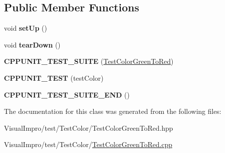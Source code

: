 \subsection*{Public Member Functions}
\begin{DoxyCompactItemize}
\item 
\mbox{\label{class_test_color_green_to_red_a1d3efc7d15a05c951a56916af3e9d48d}} 
void {\bfseries set\+Up} ()
\item 
\mbox{\label{class_test_color_green_to_red_a3a2f7169de469ee4d45d1b8146bbd484}} 
void {\bfseries tear\+Down} ()
\item 
\mbox{\label{class_test_color_green_to_red_a99e5c1ba045c28189f0a2e46fedb7020}} 
{\bfseries C\+P\+P\+U\+N\+I\+T\+\_\+\+T\+E\+S\+T\+\_\+\+S\+U\+I\+TE} (\mbox{\hyperlink{class_test_color_green_to_red}{Test\+Color\+Green\+To\+Red}})
\item 
\mbox{\label{class_test_color_green_to_red_ac56aef62b9bb965eaf2833a48be73298}} 
{\bfseries C\+P\+P\+U\+N\+I\+T\+\_\+\+T\+E\+ST} (test\+Color)
\item 
\mbox{\label{class_test_color_green_to_red_a893c499b5165abf0976094ece309470a}} 
{\bfseries C\+P\+P\+U\+N\+I\+T\+\_\+\+T\+E\+S\+T\+\_\+\+S\+U\+I\+T\+E\+\_\+\+E\+ND} ()
\end{DoxyCompactItemize}


The documentation for this class was generated from the following files\+:\begin{DoxyCompactItemize}
\item 
Visual\+Impro/test/\+Test\+Color/Test\+Color\+Green\+To\+Red.\+hpp\item 
Visual\+Impro/test/\+Test\+Color/\mbox{\hyperlink{_test_color_green_to_red_8cpp}{Test\+Color\+Green\+To\+Red.\+cpp}}\end{DoxyCompactItemize}
